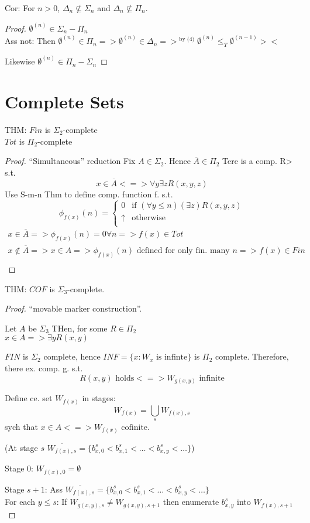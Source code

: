 \documentclass[12pt]{article}
\newcommand{\Conj}[1]{\ensuremath{\overline{#1}}}
\begin{document}
\begin{pthm}
Cor: For $n > 0$, $\Delta_n \not\subseteq \Sigma_n$ and $\Delta_n \not\subseteq \Pi_n$.
\begin{proof}
 $\emptyset^{(n)} \in \Sigma_n - \Pi_n$ \\
	Ass not: Then $\emptyset^{(n)} \in \Pi_n => \emptyset^{(n)} \in \Delta_n 
	=>^{\text{ by (4)}} \emptyset^{(n)} \le_T \emptyset^{(n-1)} ><$

	Likewise $\emptyset^{(n)} \in \Pi_n - \Sigma_n$
\end{proof}

\section*{Complete Sets}
THM: $Fin$ is $\Sigma_2$-complete \\
$Tot$ is $\Pi_2$-complete
\begin{proof}
 ``Simultaneous'' reduction
	Fix $ A \in \Sigma_2$. Hence $\Conj{A} \in \Pi_2$
	Tere is a comp. R> s.t.
\[
 x \in \Conj{A} <=> \forall y \exists z R(x,y,z)
\]
Use S-m-n Thm to define comp. function f. s.t. 
\[
 \phi_{f(x)}(n) = \begin{cases}
                   0		&\text{if } (\forall y \le n) (\exists z) R(x,y,z) \\
                   \uparrow	&\text{otherwise}\\
                  \end{cases}
\]
\begin{align*}
 x \in \Conj{A} => \phi_{f(x)}(n) = 0 \forall n => f(x) \in Tot \\
 x \not\in \Conj{A} => x \in A => 
\phi_{f(x)}(n) \text{ defined for only fin. many $n$} => f(x) \in Fin \\
\end{align*}
\end{proof}

THM: $COF$ is $\Sigma_3$-complete.
\begin{proof} ``movable marker construction''.

Let $A$ be $\Sigma_3$  THen, for some $R \in \Pi_2$ \\
$x\in A=> \exists y R(x,y)$

$FIN$ is $\Sigma_2$ complete, hence $INF = \{x : W_x \text{ is infinte} \}$ is
$\Pi_2$ complete.  Therefore, there ex. comp. g. s.t.
\[
 R(x,y) \text{ holds} <=> W_{g(x,y)} \text{ infinite}
\]

Define ce. set $W_{f(x)}$ in stages:
\[
 W_{f(x)} = \bigcup_s W_{f(x),s}
\]
sych that
$x \in A <=> W_{f(x)} \text{ cofinite.}$

(At stage $s$
$
 \Conj{W_{f(x),s}} = \{ b^s_{x,0} < b^s_{x,1} < \ldots < b^s_{x,y} < \ldots \}
$)

Stage 0: $W_{f(x),0} = \emptyset$

Stage $s+1$:  Ass  $\Conj{W_{f(x),s}} = \{ b^s_{x,0} < b^s_{x,1} < \ldots < b^s_{x,y} < \ldots \}$ \\
For each $y \le s$:
If $W_{g(x,y),s} \ne W_{g(x,y),s+1}$
then enumerate $b^s_{x,y}$ into $W_{f(x),s+1}$


\end{proof}



\end{pthm}
\end{document}
